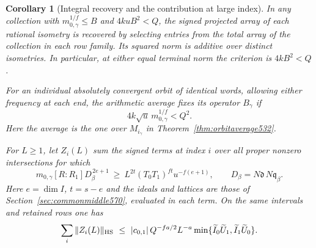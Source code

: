 \documentclass[a4paper,11pt]{article}
\newtheorem{corollary}[proposition]{Corollary}
\theoremstyle{definition}
\theoremstyle{remark}
\numberwithin{equation}{section}
\begin{document}
\begin{corollary}[Integral recovery and the contribution at large index]
\leavevmode\label{cor:indexperiod576}
In any collection with \(m_{0,\gamma}^{1/f}\le B\) and
\(4kuB^2<Q\), the signed projected array of each rational
isometry is recovered by selecting entries from the total
array of the collection in each row family. Its squared norm
is additive over distinct isometries. In particular, at
either equal terminal norm the criterion is \(4kB^2<Q\).

For an individual absolutely convergent orbit of identical
words, allowing either frequency at each end, the arithmetic
average fixes its operator \(B_\gamma\) if
\[
                  4k\sqrt u\,m_{0,\gamma}^{1/f}<Q^2 .
\]
Here the average is the one over \(M_{i_\gamma}\) in
Theorem~\ref{thm:orbitaverage532}.

For \(L\ge1\), let \(Z_i(L)\) sum the signed terms at index
\(i\) over all proper nonzero intersections for which
\[
 m_{0,\gamma}[R:R_1]D_\beta^{\,2e+1}
      \ \ge\ L^{2t}(T_0T_1)^{ft}u^{-f(e+1)},\qquad
       D_\beta=N\mathfrak d\,N\mathfrak q_\beta .
\]
Here \(e=\dim I\), \(t=s-e\) and the ideals and lattices are
those of Section~\ref{sec:commonmiddle570}, evaluated in each
term. On the same intervals and retained rows one has
\[
 \sum_i\|Z_i(L)\|_{\rm HS}\ \le\
 |c_{0,1}|\,Q^{-fa/2}L^{-a}
       \min\{\widetilde I_0\widetilde U_1,
                       \widetilde I_1\widetilde U_0\}.
\]
\end{corollary}
\end{document}
